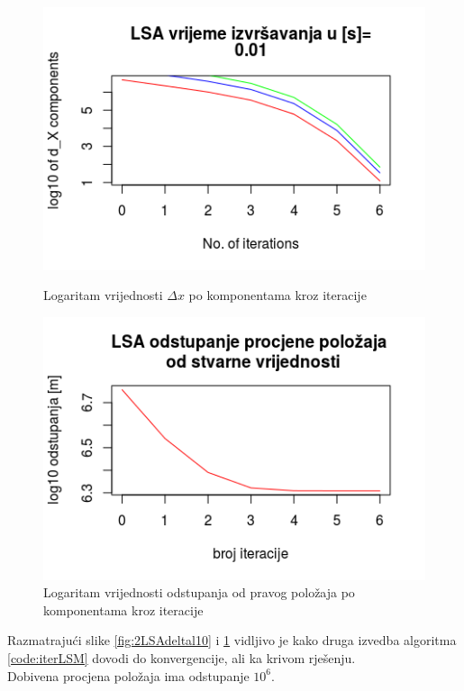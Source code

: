 \documentclass[a4paper,twoside,12pt]{memoir} %
\begin{document}
\begin{figure}[H]
	\begin{minipage}{0.48\textwidth}
		\centering
		\includegraphics[width=1\textwidth]{2LSAdeltal10}
		\caption{Logaritam vrijednosti $\Delta x$ po komponentama kroz iteracije}
		\label{fig:2LSAdeltal10}
	\end{minipage}%
	\hspace{1cm}
	\begin{minipage}{0.48\textwidth}
		
		\includegraphics[width=1\textwidth]{2LSAreall10}
		\caption{Logaritam vrijednosti odstupanja od pravog položaja po komponentama kroz iteracije}
		\label{fig:2LSAreall10}
	\end{minipage}%
\end{figure}

Razmatrajući slike \ref{fig:2LSAdeltal10} i \ref{fig:2LSAreall10} vidljivo je kako druga izvedba
algoritma \ref{code:iterLSM} dovodi do konvergencije, ali ka krivom rješenju.\\
Dobivena procjena položaja ima odstupanje $10^6$.
\end{document}
